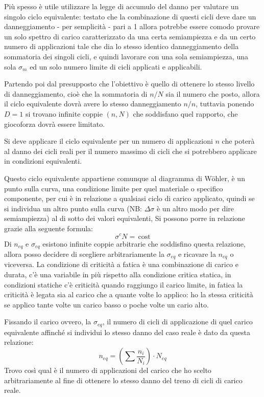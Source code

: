 				Più spesso è utile utilizzare la legge di accumulo del danno per valutare un singolo ciclo equivalente: testato che la combinazione di questi cicli deve dare un danneggiamento - per semplicità - pari a 1 allora potrebbe essere comodo provare un solo spettro di carico caratterizzato da una certa semiampiezza e da un certo numero di applicazioni tale che dia lo stesso identico danneggiamento della sommatoria dei singoli cicli, e quindi lavorare con una sola semiampiezza, una sola $\sigma_m$ ed un solo numero limite di cicli applicati e applicabili. \newline
				
				Partendo poi dal presupposto che l'obiettivo è quello di ottenere lo stesso livello di danneggiamento, cioè che la sommatoria di $n/N$ sia il numero che posto, allora il ciclo equivalente dovrà avere lo stesso danneggiamento $n/n$, tuttavia ponendo $D=1$ si trovano infinite coppie $(n,N)$ che soddisfano quel rapporto, che giocoforza dovrà essere limitato.
				
				Si deve applicare il ciclo equivalente per un numero di applicazioni $n$ che poterà al danno dei cicli reali per il numero massimo di cicli che si potrebbero applicare in condizioni equivalenti.
				
				Questo ciclo equivalente appartiene comunque al diagramma di Wöhler, è un punto sulla curva, una condizione limite per quel materiale o specifico componente, per cui è in relazione a qualsiasi ciclo di carico applicato, quindi se si individua un altro punto sulla curva (NB: $\Delta\sigma$ è un altro modo per dire semiampiezza) al di sotto dei valori equivalenti, Si possono porre in relazione grazie alla seguente formula:
				\[\sigma^cN=\,\text{cost}\]				
				Di $n_{eq}$ e $\sigma_{eq}$ esistono infinite coppie arbitrarie che soddisfino questa relazione, allora posso decidere di scegliere arbitrariamente la $\sigma_{eq}$ e ricavare la $n_{eq}$ o viceversa. La condizione di criticità a fatica è una combinazione di carico e durata, c'è una variabile in più rispetto alla condizione critica statica, in condizioni statiche c'è criticità quando raggiungo il carico limite, in fatica la criticità è legata sia al carico che a quante volte lo applico: ho la stessa criticità se applico tante volte un carico basso o poche volte un cario alto.
				
				Fissando il carico ovvero, la $\sigma_{eq}$, il numero di cicli di applicazione di quel carico equivalente affinché si individui lo stesso danno del caso reale è dato da questa relazione:
				\[n_{eq} = \left(\sum \dfrac{n_i}{N_i}\right)\cdot N_{eq}\]
				Trovo così qual è il numero di applicazioni del carico che ho scelto arbitrariamente al fine di ottenere lo stesso danno del treno di cicli di carico reale. \newline 
				
